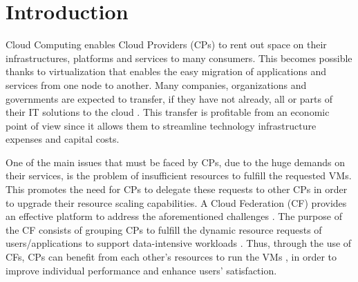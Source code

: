 \documentclass[preprint]{elsarticle}
\theoremstyle{definition}
\theoremstyle{remark}
\theoremstyle{property}
\begin{document}



%


\section{Introduction}
\label{Sec:Intro}

Cloud Computing enables Cloud Providers (CPs) to rent out space on their infrastructures, platforms and services to many consumers. This becomes possible thanks to virtualization that enables the easy migration of applications and services from one node to another. Many companies, organizations and
governments are expected to transfer, if they have not already, all or parts of their IT solutions to the cloud \cite{gonzales2015cloud}. This transfer is profitable from an economic point of view since it allows them to streamline technology infrastructure expenses and capital costs.

One of the main issues that must be faced by CPs, due to the huge demands on their services, is the problem of insufficient resources to fulfill
the requested VMs. This promotes the need for CPs
to delegate these requests to other CPs in order
to upgrade their resource scaling capabilities. A Cloud Federation (CF) provides an effective platform to address
the aforementioned challenges \cite{rochwerger2011reservoir}. The purpose of the CF
consists of grouping CPs to fulfill the dynamic
resource requests of users/applications to support data-intensive
workloads \cite{celesti2010enhance}. Thus, through the use of CFs, CPs can benefit from each other's
resources to run the VMs \cite{guazzone2014game} \cite{rochwerger2011reservoir} \cite{celesti2010enhance}, in order to improve individual performance and enhance users’ satisfaction.
\end{document}

